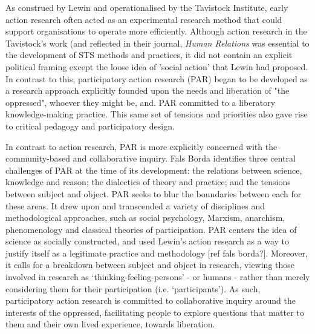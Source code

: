 As construed by Lewin and operationalised by the Tavistock Institute, early action research often acted as an experimental research method that could support organisations to operate more efficiently\cite{neumann_kurt_2005}. Although action research in the Tavistock's work (and reflected in their journal, \textit{Human Relations} was essential to the development of STS methods and practices, it did not contain an explicit political framing except the loose idea of 'social action' that Lewin had proposed. In contrast to this, participatory action research (PAR) began to be developed as a research approach explicitly founded upon the needs and liberation of "the oppressed", whoever they might be, and. PAR committed to a liberatory knowledge-making practice\cite{reason_handbook_2006}. This same set of tensions and priorities also gave rise to critical pedagogy and participatory design.

In contrast to action research, PAR is more explicitly concerned with the community-based and collaborative inquiry. Fals Borda \citep{2001} identifies three central challenges of PAR at the time of its development: the relations between science, knowledge and reason; the dialectics of theory and practice; and the tensions between subject and object. PAR seeks to blur the boundaries between each for these areas.   It drew upon and transcended a variety of disciplines and methodological approaches, such as social psychology, Marxism, anarchism, phenomenology and classical theories of participation. PAR centers the idea of science as socially constructed, and used Lewin’s action research as a way to justify itself as a legitimate practice and methodology [ref fals borda?]. Moreover, it calls for a breakdown between subject and object in research, viewing those involved in research as ‘thinking-feeling-persons’ - or humans - rather than merely considering them for their participation (i.e. ‘participants’). As such, participatory action research is committed to collaborative inquiry around the interests of the oppressed, facilitating people to explore questions that matter to them and their own lived experience, towards liberation. 	

